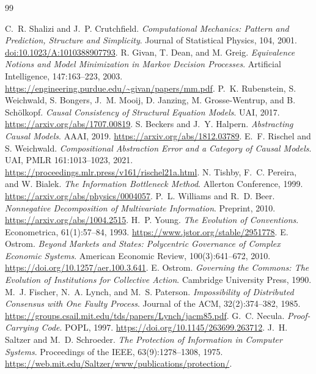 \documentclass[11pt,letterpaper]{article}
\theoremstyle{plain}
\theoremstyle{definition}
\theoremstyle{remark}
\begin{document}


\clearpage
\begin{thebibliography}{99}
\small
\setlength{\itemsep}{.12em}
\setlength{\parsep}{0pt}
\raggedright
{}
 C.~R. Shalizi and J.~P. Crutchfield. \emph{Computational Mechanics: Pattern and Prediction, Structure and Simplicity}. Journal of Statistical Physics, 104, 2001. \href{https://doi.org/10.1023/A:1010388907793}{doi:10.1023/A:1010388907793}.
 R. Givan, T. Dean, and M. Greig. \emph{Equivalence Notions and Model Minimization in Markov Decision Processes}. Artificial Intelligence, 147:163--223, 2003. \url{https://engineering.purdue.edu/~givan/papers/mm.pdf}.
 P.~K. Rubenstein, S. Weichwald, S. Bongers, J.~M. Mooij, D. Janzing, M. Grosse-Wentrup, and B. Sch\"olkopf. \emph{Causal Consistency of Structural Equation Models}. UAI, 2017. \url{https://arxiv.org/abs/1707.00819}.
 S. Beckers and J.~Y. Halpern. \emph{Abstracting Causal Models}. AAAI, 2019. \url{https://arxiv.org/abs/1812.03789}.
 E.~F. Rischel and S. Weichwald. \emph{Compositional Abstraction Error and a Category of Causal Models}. UAI, PMLR 161:1013--1023, 2021. \url{https://proceedings.mlr.press/v161/rischel21a.html}.
 N. Tishby, F.~C. Pereira, and W. Bialek. \emph{The Information Bottleneck Method}. Allerton Conference, 1999. \url{https://arxiv.org/abs/physics/0004057}.
 P.~L. Williams and R.~D. Beer. \emph{Nonnegative Decomposition of Multivariate Information}. Preprint, 2010. \url{https://arxiv.org/abs/1004.2515}.
 H.~P. Young. \emph{The Evolution of Conventions}. Econometrica, 61(1):57--84, 1993. \url{https://www.jstor.org/stable/2951778}.
 E. Ostrom. \emph{Beyond Markets and States: Polycentric Governance of Complex Economic Systems}. American Economic Review, 100(3):641--672, 2010. \url{https://doi.org/10.1257/aer.100.3.641}.
 E. Ostrom. \emph{Governing the Commons: The Evolution of Institutions for Collective Action}. Cambridge University Press, 1990.
 M.~J. Fischer, N.~A. Lynch, and M.~S. Paterson. \emph{Impossibility of Distributed Consensus with One Faulty Process}. Journal of the ACM, 32(2):374--382, 1985. \url{https://groups.csail.mit.edu/tds/papers/Lynch/jacm85.pdf}.
 G.~C. Necula. \emph{Proof-Carrying Code}. POPL, 1997. \url{https://doi.org/10.1145/263699.263712}.
 J.~H. Saltzer and M.~D. Schroeder. \emph{The Protection of Information in Computer Systems}. Proceedings of the IEEE, 63(9):1278--1308, 1975. \url{https://web.mit.edu/Saltzer/www/publications/protection/}.

\end{thebibliography}
\end{document}
